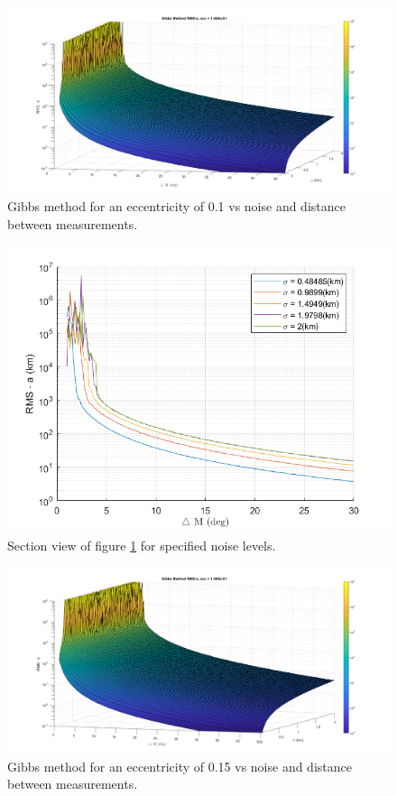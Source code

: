 \documentclass[12pt]{article}
\begin{document}
	\begin{figure}[H]
	\centering
	\includegraphics[width=0.7\linewidth]{gibbs_e_1}
	\caption{Gibbs method for an eccentricity of 0.1 vs noise and distance between measurements.}
	\label{fig:gibbse1}
\end{figure}

\begin{figure}[H]
	\centering
	\includegraphics[width=0.7\linewidth]{gibbs_e_1_side}
	\caption{Section view of figure \ref{fig:gibbse1} for specified noise levels.}
	\label{fig:Sidegibbse1}
\end{figure}

	\begin{figure}[H]
	\centering
	\includegraphics[width=0.7\linewidth]{gibbs_e_15}
	\caption{Gibbs method for an eccentricity of 0.15 vs noise and distance between measurements.}
	\label{fig:gibbse15}
\end{figure}
\end{document}
